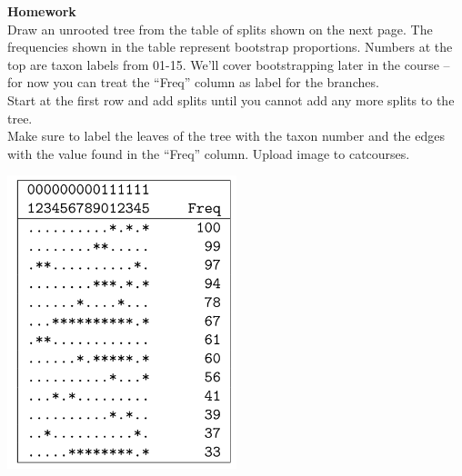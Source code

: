 \documentclass{beamer}
\begin{document}
\begin{frame}
\textbf{Homework\\}
Draw an unrooted tree from the table of splits shown on the next page.
The frequencies shown in the table represent bootstrap proportions. 
Numbers at the top are taxon labels from 01-15.
We’ll
cover bootstrapping later in the course – for now you can treat the “Freq”
column as label for the branches.\\
Start at the first row and add splits until you cannot add any more splits to
the tree.\\
Make sure to label the leaves of the tree with the taxon number and the
edges with the value found in the “Freq” column.
Upload image to catcourses.
\end{frame}

\begin{frame}
\includegraphics[width=0.5\textwidth]{splits}
\end{frame}
\end{document}
